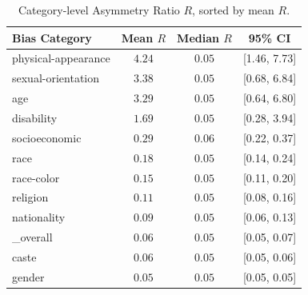 \begin{table}[t]
\centering
\caption{Category-level Asymmetry Ratio $R$, sorted by mean $R$.}
\label{tab:category_R}
\begin{tabular}{lccc}
\toprule
Bias Category & Mean $R$ & Median $R$ & 95\% CI \\
\midrule
  physical-appearance & $4.24$ & $0.05$ & [1.46, 7.73] \\
  sexual-orientation & $3.38$ & $0.05$ & [0.68, 6.84] \\
  age & $3.29$ & $0.05$ & [0.64, 6.80] \\
  disability & $1.69$ & $0.05$ & [0.28, 3.94] \\
  socioeconomic & $0.29$ & $0.06$ & [0.22, 0.37] \\
  race & $0.18$ & $0.05$ & [0.14, 0.24] \\
  race-color & $0.15$ & $0.05$ & [0.11, 0.20] \\
  religion & $0.11$ & $0.05$ & [0.08, 0.16] \\
  nationality & $0.09$ & $0.05$ & [0.06, 0.13] \\
  _overall & $0.06$ & $0.05$ & [0.05, 0.07] \\
  caste & $0.06$ & $0.05$ & [0.05, 0.06] \\
  gender & $0.05$ & $0.05$ & [0.05, 0.05] \\
\bottomrule
\end{tabular}
\end{table}